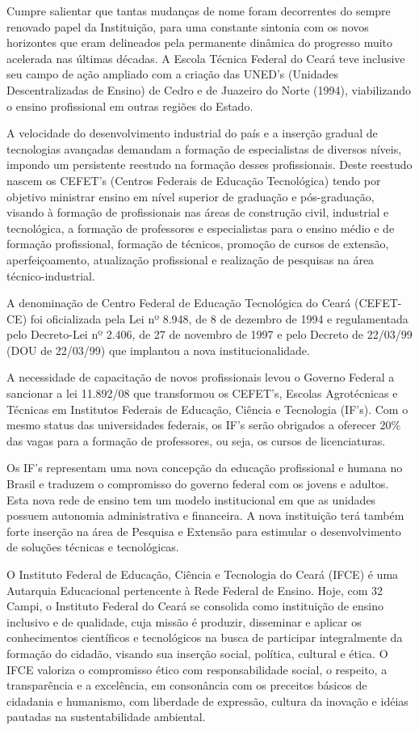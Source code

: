 \documentclass{paper}
\begin{document}
Cumpre salientar que tantas mudanças de nome foram decorrentes do sempre renovado papel da Instituição, para uma constante sintonia com os novos horizontes que eram delineados pela permanente dinâmica do progresso muito acelerada nas últimas décadas. A Escola Técnica Federal do Ceará teve inclusive seu campo de ação ampliado com a criação das UNED’s (Unidades Descentralizadas de Ensino) de Cedro e de Juazeiro do Norte (1994), viabilizando o ensino profissional em outras regiões do Estado.

A velocidade do desenvolvimento industrial do país e a inserção gradual de tecnologias avançadas demandam a formação de especialistas de diversos níveis, impondo um persistente reestudo na formação desses profissionais. Deste reestudo nascem os CEFET’s (Centros Federais de Educação Tecnológica) tendo por objetivo ministrar ensino em nível superior de graduação e pós-graduação, visando à formação de profissionais nas áreas de construção civil, industrial e tecnológica, a formação de professores e especialistas para o ensino médio e de formação profissional, formação de técnicos, promoção de cursos de extensão, aperfeiçoamento, atualização profissional e realização de pesquisas na área
técnico-industrial.

A denominação de Centro Federal de Educação Tecnológica do Ceará (CEFET-CE) foi oficializada pela Lei nº 8.948, de 8 de dezembro de 1994 e regulamentada pelo Decreto-Lei nº 2.406, de 27 de novembro de 1997 e pelo Decreto de 22/03/99 (DOU
de 22/03/99) que implantou a nova institucionalidade.

A necessidade de capacitação de novos profissionais levou o Governo Federal a sancionar a lei 11.892/08 que transformou os CEFET’s, Escolas Agrotécnicas e Técnicas em Institutos Federais de Educação, Ciência e Tecnologia (IF’s). Com o mesmo status das universidades federais, os IF’s serão obrigados a oferecer 20\% das vagas para a formação de professores, ou seja, os cursos de licenciaturas.

Os IF’s representam uma nova concepção da educação profissional e humana no Brasil e traduzem o compromisso do governo federal com os jovens e adultos. Esta nova rede de ensino tem um modelo institucional em que as unidades possuem autonomia administrativa e financeira. A nova instituição terá também forte inserção na área de Pesquisa e Extensão para estimular o desenvolvimento de soluções técnicas e tecnológicas.

O Instituto Federal de Educação, Ciência e Tecnologia do Ceará (IFCE) é uma Autarquia Educacional pertencente à Rede Federal de Ensino. Hoje, com 32 Campi, o Instituto Federal do Ceará se consolida como instituição de ensino inclusivo e de qualidade, cuja missão é produzir, disseminar e aplicar os conhecimentos científicos e tecnológicos na busca de participar integralmente da formação do cidadão, visando sua inserção social, política, cultural e ética.  O IFCE valoriza o compromisso ético com responsabilidade social, o respeito, a transparência e a excelência, em consonância com os preceitos básicos de cidadania e humanismo, com liberdade de expressão, cultura da inovação e idéias pautadas na sustentabilidade ambiental.
\end{document}
